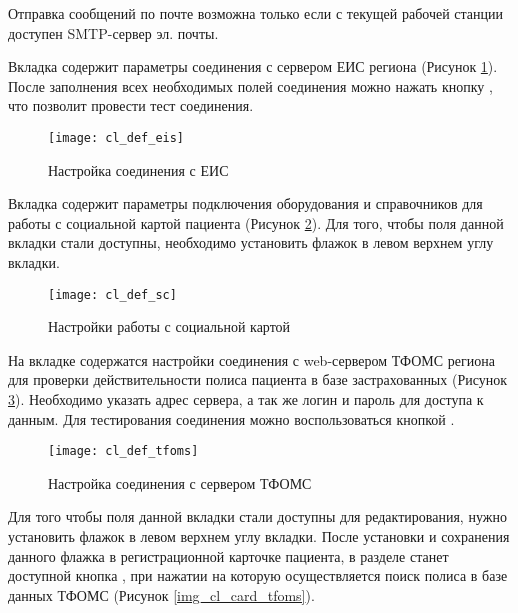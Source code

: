 \begin{vnim}
 Отправка сообщений по почте возможна только если с текущей рабочей станции доступен SMTP-сервер эл. почты.
\end{vnim}
 
Вкладка  содержит параметры соединения с сервером ЕИС региона (Рисунок \ref{img_cl_def_eis}). После заполнения всех необходимых полей соединения можно нажать кнопку , что позволит провести тест соединения.

\begin{figure}[ht]\centering
 \texttt{[image: cl\_def\_eis]}
 \caption{Настройка соединения с ЕИС}
 \label{img_cl_def_eis}
\end{figure} 

Вкладка  содержит параметры подключения оборудования и справочников для работы с социальной картой пациента (Рисунок \ref{img_cl_def_sc}). Для того, чтобы поля данной вкладки стали доступны, необходимо установить флажок  в левом верхнем углу вкладки.

\begin{figure}[ht]\centering
 \texttt{[image: cl\_def\_sc]}
 \caption{Настройки работы с социальной картой}
 \label{img_cl_def_sc}
\end{figure} 

На вкладке  содержатся настройки соединения с web-сервером ТФОМС региона для проверки действительности полиса пациента в базе застрахованных (Рисунок \ref{img_cl_def_tfoms}). Необходимо указать адрес сервера, а так же логин и пароль для доступа к данным. Для тестирования соединения можно воспользоваться кнопкой .

\begin{figure}[ht]\centering
 \texttt{[image: cl\_def\_tfoms]}
 \caption{Настройка соединения с сервером ТФОМС}
 \label{img_cl_def_tfoms}
\end{figure} 

Для того чтобы поля данной вкладки стали доступны для редактирования, нужно установить флажок  в левом верхнем углу вкладки. После установки и сохранения данного флажка в регистрационной карточке пациента, в разделе  станет доступной кнопка , при нажатии на которую осуществляется поиск полиса в базе данных ТФОМС (Рисунок \ref{img_cl_card_tfoms}).

